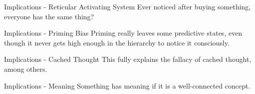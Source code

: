 \begin{frame}[c]{Implications - Reticular Activating System}
    \Large
    Ever noticed after buying something, \\
    everyone has the same thing?
\end{frame}


\begin{frame}[c]{Implications - Priming Bias}
    \Large
    \pause
    Priming really leaves some predictive states, even though it never gets
    high enough in the hierarchy to notice it consciously.
\end{frame}




\begin{frame}[c]{Implications - Cached Thought}
    \Large
    This fully explains the fallacy of cached thought, among others.
\end{frame}


\begin{frame}[c]{Implications - Meaning}
    \Large
    Something has meaning if it is a well-connected concept.
\end{frame}










